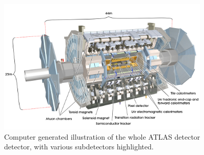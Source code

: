 

\begin{figure}[tp]
  \centering
  \includegraphics[width=0.90\textwidth]{fig/atlas/atlaspic.jpg}
  \caption{Computer generated illustration of the whole ATLAS detector detector, with various subdetectors highlighted\cite{Pequenao:1095924}.}
  \label{fig:atlas-cgi}
\end{figure}

